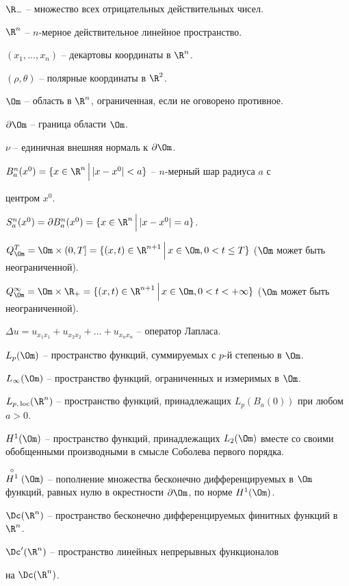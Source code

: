 \documentclass[a4paper]{article}
\def\D{\Delta}
\def\loc{\mathop{\rm loc}}
\begin{document}
\noindent
$\R_-$ -- множество всех отрицательных действительных чисел.

\noindent
$\R^n$ -- $n$-мерное действительное линейное пространство.

\noindent
$(x_1,\dots,x_n)$ -- декартовы координаты в $\R^n$.

\noindent
$(\rho, \theta)$ -- полярные координаты в $\R^2$.

\noindent
$\Om$ -- область в $\R^n$, ограниченная, если не оговорено противное.

\noindent
$\partial \Om$ -- граница области $\Om$.

\noindent
$\nu$ -- единичная внешняя нормаль к $\partial\Om$.

\noindent
$B_a^n(x^0)=\{x\in\R^n\, \Big|\, |x-x^0|<a\}$ -- $n$-мерный шар
радиуса $a$ с

\noindent
центром $x^0$.

\noindent
$S_a^n(x^0)=\partial B_a^n(x^0)=\{x\in\R^n\, \Big|\, |x-x^0|=a\}$.

\noindent
$Q_\Om^T=\Om\times(0,T]=\{(x,t)\in\R^{n+1}\, \Big|\, x\in \Om, 0<t\le T\}$
($\Om$ может быть неограниченной).

\noindent
$Q_\Om^\infty=\Om\times\R_+=\{(x,t)\in\R^{n+1}\, \Big|\, x\in \Om, 0<
t<+\infty\}$ ($\Om$ может быть неограниченной).

\noindent
$\D u= u_{x_1x_1}+u_{x_2x_2}+\dots+u_{x_nx_n}$ -- оператор Лапласа.

\noindent
$L_p(\Om)$ -- пространство функций, суммируемых с $p$-й степенью в $\Om$.

\noindent
$L_\infty(\Om)$ -- пространство функций, ограниченных и измеримых в $\Om$.

\noindent
$L_{p,\, \loc}(\R^n)$ -- пространство функций, принадлежащих
$L_p(B_a(0))$
при любом $a>0$.

\noindent
$H^1(\Om)$ -- пространство функций, принадлежащих $L_2(\Om)$ вместе со своими
обобщенными производными в смысле Соболева первого порядка.

\noindent
$\stackrel{\circ}{H^1}(\Om)$ -- пополнение множества бесконечно
дифференцируемых в $\Om$ функций, равных нулю в окрестности $\partial\Om$,
по норме $H^1(\Om)$.

\noindent
$\Dc(\R^n)$ -- пространство бесконечно дифференцируемых финитных функций в
$\R^n$.

\noindent
$\Dc'(\R^n)$ -- пространство линейных непрерывных функционалов

\noindent
на $\Dc(\R^n)$.
\end{document}

